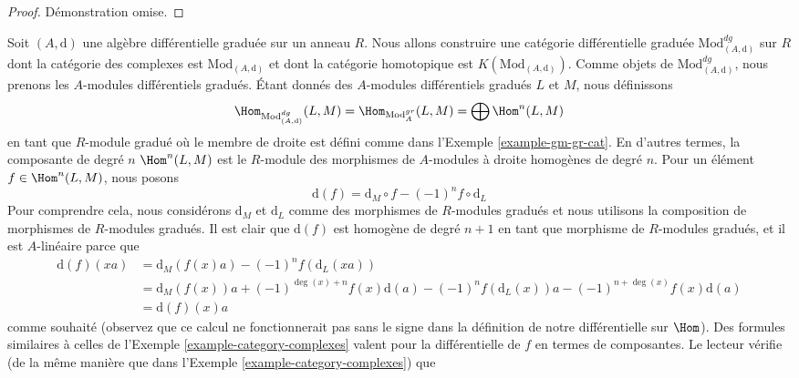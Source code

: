 \begin{proof}
Démonstration omise.
\end{proof}

\begin{example}
\label{example-dgm-dg-cat}
Soit $(A, \text{d})$ une algèbre différentielle graduée sur un anneau $R$. Nous
allons construire une catégorie différentielle graduée $\text{Mod}^{dg}_{(A,
\text{d})}$ sur $R$ dont la catégorie des complexes est $\text{Mod}_{(A,
\text{d})}$ et dont la catégorie homotopique est $K(\text{Mod}_{(A, \text{d})})$.
Comme objets de $\text{Mod}^{dg}_{(A, \text{d})}$, nous prenons les $A$-modules
différentiels gradués. Étant donnés des $A$-modules différentiels gradués $L$ et
$M$, nous définissons
$$
\Hom_{\text{Mod}^{dg}_{(A, \text{d})}}(L, M) =
\Hom_{\text{Mod}^{gr}_A}(L, M) = \bigoplus \Hom^n(L, M)
$$
en tant que $R$-module gradué où le membre de droite est défini comme dans l'Exemple
\ref{example-gm-gr-cat}. En d'autres termes, la composante de degré $n$ $\Hom^n(L,
M)$ est le $R$-module des morphismes de $A$-modules à droite homogènes de degré $n$.
Pour un élément $f \in \Hom^n(L, M)$, nous posons
$$
\text{d}(f) = \text{d}_M \circ f - (-1)^n f \circ \text{d}_L
$$
Pour comprendre cela, nous considérons $\text{d}_M$ et $\text{d}_L$ comme des
morphismes de $R$-modules gradués et nous utilisons la composition
de morphismes de $R$-modules gradués. Il est clair que $\text{d}(f)$ est homogène
de degré $n + 1$ en tant que morphisme de $R$-modules gradués, et il est
$A$-linéaire parce que
\begin{align*}
\text{d}(f)(xa)
& =
\text{d}_M(f(x) a) - (-1)^n f (\text{d}_L(xa)) \\
& =
\text{d}_M(f(x)) a + (-1)^{\deg(x) + n} f(x) \text{d}(a) 
- (-1)^n f(\text{d}_L(x)) a - (-1)^{n + \deg(x)} f(x) \text{d}(a) \\
& = \text{d}(f)(x) a
\end{align*}
comme souhaité (observez que ce calcul ne fonctionnerait pas sans le signe dans la
définition de notre différentielle sur $\Hom$). Des formules similaires à celles de
l’Exemple \ref{example-category-complexes} valent pour la différentielle de $f$ en
termes de composantes. Le lecteur vérifie (de la même manière que dans l’Exemple
\ref{example-category-complexes}) que
\end{example}
